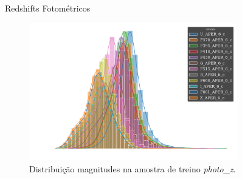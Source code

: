 \begin{frame}[c]{Redshifts Fotométricos}
    \vspace{0.5cm}
    \begin{figure}
        \centering
        \includegraphics[width=1.\linewidth, height=6cm, keepaspectratio]{images/overlaid_histogram_mags_aper_6_c.png}
        \caption{Distribuição magnitudes na amostra de treino \textit{photo\_z}.}
    \end{figure}
\end{frame}

